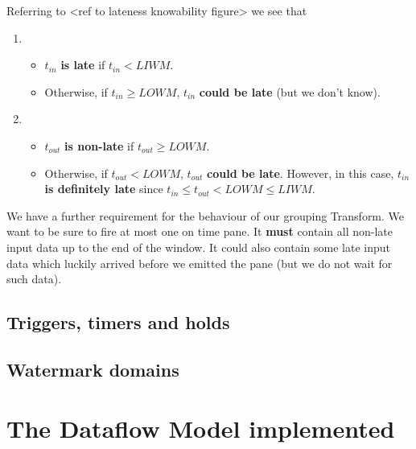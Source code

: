 Referring to <ref to lateness knowability figure> we see that
\begin{enumerate}
	\item \begin{itemize}
	\item $t_{\mathit{in}}$ \textbf{is late} if $t_{\mathit{in}} < \mathit{LIWM}$.
	\item Otherwise, if $t_{\mathit{in}} \geq \mathit{LOWM}$, $t_{\mathit{in}}$ \textbf{could be late} (but we don't know).
	\end{itemize}
	\item \begin{itemize}
	\item $t_{\mathit{out}}$ \textbf{is non-late} if $t_{\mathit{out}} \geq \mathit{LOWM}$.
	\item Otherwise, if $t_{\mathit{out}} < \mathit{LOWM}$, $t_{\mathit{out}}$ \textbf{could be late}. However, in this case, $t_{\mathit{in}}$ \textbf{is definitely late} since $t_{\mathit{in}} \leq t_{\mathit{out}} < \mathit{LOWM} \leq \mathit{LIWM}$.
	\end{itemize}
\end{enumerate}

We have a further requirement for the behaviour of our grouping Transform.
We want to be sure to fire at most one on time pane.
It \textbf{must} contain all non-late input data up to the end of the window.
It could also contain some late input data which luckily arrived before we emitted the pane (but we do not wait for such data).



\subsection{Triggers, timers and holds}

\subsection{Watermark domains}


\section{The Dataflow Model implemented}\label{sec:impl:approach}

